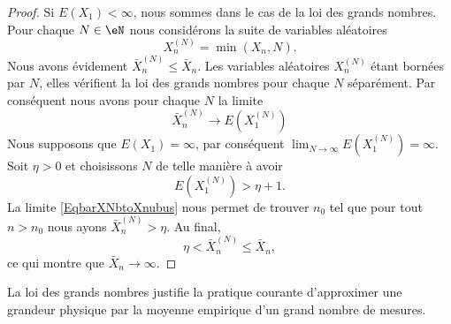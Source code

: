 \begin{proof}
    Si \( E(X_1)<\infty\), nous sommes dans le cas de la loi des grands nombres. Pour chaque \( N\in\eN\) nous considérons la suite de variables aléatoires
    \begin{equation}
        X_n^{(N)}=\min(X_n,N).
    \end{equation}
    Nous avons évidement \( \bar X^{(N)}_n\leq \bar X_n\). Les variables aléatoires \( X^{(N)}_n\) étant bornées par \( N\), elles vérifient la loi des grands nombres pour chaque \( N\) séparément. Par conséquent nous avons pour chaque \( N\) la limite
    \begin{equation}        \label{EqbarXNbtoXnubus}
        \bar X^{(N)}_n\to E(X^{(N)}_1)
    \end{equation}
    Nous supposons que \( E(X_1)=\infty\), par conséquent  \( \lim_{N\to\infty}E(X_1^{(N)})=\infty\). Soit \( \eta>0\) et choisissons \( N\) de telle manière à avoir
    \begin{equation}
        E(X_1^{(N)})>\eta+1.
    \end{equation}
    La limite \eqref{EqbarXNbtoXnubus} nous permet de trouver \( n_0\) tel que pour tout \( n>n_0\) nous ayons \( \bar X^{(N)}_n>\eta\). Au final,
    \begin{equation}
        \eta<\bar X^{(N)}_n\leq \bar X_n,
    \end{equation}
    ce qui montre que \( \bar X_n\to\infty\).
\end{proof}

\begin{example}
    La loi des grands nombres justifie la pratique courante d'approximer une grandeur physique par la moyenne empirique d'un grand nombre de mesures.
\end{example}

